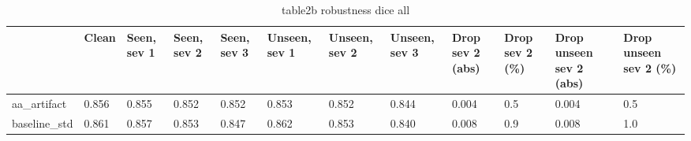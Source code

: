 \begin{table}
\caption{table2b robustness dice all}
\label{tab:table2b_robustness_dice_all}
\begin{tabular}{llllllllllll}
\toprule
 & Clean & Seen, sev 1 & Seen, sev 2 & Seen, sev 3 & Unseen, sev 1 & Unseen, sev 2 & Unseen, sev 3 & Drop sev 2 (abs) & Drop sev 2 (\%) & Drop unseen sev 2 (abs) & Drop unseen sev 2 (\%) \\
\midrule
aa\_artifact & 0.856 & 0.855 & 0.852 & 0.852 & 0.853 & 0.852 & 0.844 & 0.004 & 0.5 & 0.004 & 0.5 \\
baseline\_std & 0.861 & 0.857 & 0.853 & 0.847 & 0.862 & 0.853 & 0.840 & 0.008 & 0.9 & 0.008 & 1.0 \\
\bottomrule
\end{tabular}
\end{table}
